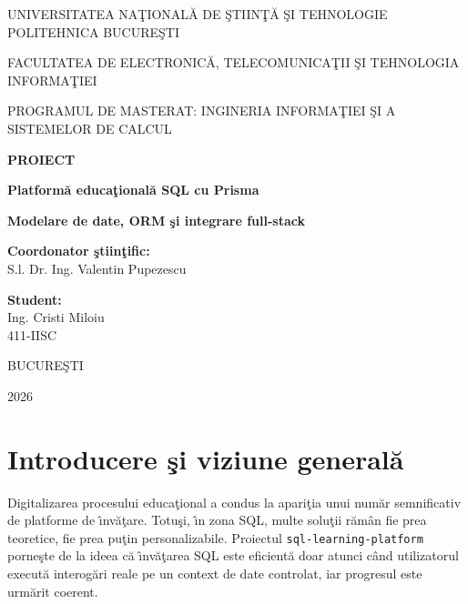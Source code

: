 \documentclass[12pt,onecolumn,draftclsnofoot]{IEEEtran}
\begin{document}
\begin{titlepage}
  \centering
  {\large UNIVERSITATEA NA\c{T}IONAL\u{A} DE \c{S}TIIN\c{T}\u{A} \c{S}I TEHNOLOGIE POLITEHNICA BUCURE\c{S}TI\par}
  \vspace{0.35cm}
  {\large FACULTATEA DE ELECTRONIC\u{A}, TELECOMUNICA\c{T}II \c{S}I TEHNOLOGIA INFORMA\c{T}IEI\par}
  \vspace{0.35cm}
  {\large PROGRAMUL DE MASTERAT: INGINERIA INFORMA\c{T}IEI \c{S}I A SISTEMELOR DE CALCUL\par}

  \vspace{2.8cm}
  {\Huge \textbf{PROIECT}\par}
  \vspace{0.8cm}
  {\LARGE \textbf{Platform\u{a} educa\c{t}ional\u{a} SQL cu Prisma}\par}
  \vspace{0.3cm}
  {\Large \textbf{Modelare de date, ORM \c{s}i integrare full-stack}\par}

  \vfill
  \begin{minipage}{0.45\textwidth}
    \raggedright
    \textbf{Coordonator \c{s}tiin\c{t}ific:}\\
    S.l. Dr. Ing. Valentin Pupezescu
  \end{minipage}
  \hfill
  \begin{minipage}{0.45\textwidth}
    \raggedleft
    \textbf{Student:}\\
    Ing. Cristi Miloiu\\
    411-IISC
  \end{minipage}

  \vspace{2cm}
  {\large BUCURE\c{S}TI\par}
  {\large 2026\par}
\end{titlepage}

\clearpage
\tableofcontents
\clearpage
{}

\section{Introducere \c{s}i viziune general\u{a}}

Digitalizarea procesului educa\c{t}ional a condus la apari\c{t}ia unui num\u{a}r semnificativ de platforme de \^{\i}nv\u{a}\c{t}are. Totu\c{s}i, \^{\i}n zona SQL, multe solu\c{t}ii r\u{a}m\^{a}n fie prea teoretice, fie prea pu\c{t}in personalizabile. Proiectul \texttt{sql-learning-platform} porne\c{s}te de la ideea c\u{a} \^{\i}nv\u{a}\c{t}area SQL este eficient\u{a} doar atunci c\^{a}nd utilizatorul execut\u{a} interog\u{a}ri reale pe un context de date controlat, iar progresul este urm\u{a}rit coerent.
\end{document}
